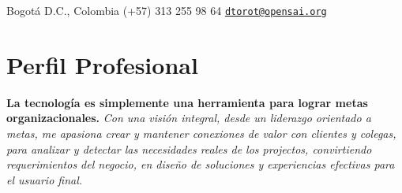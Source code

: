 \documentclass[overlapped,line,final]{../../templates/MichaelDeCorteCV/lib/res}
\begin{document}

\begin{resume}


	\begin{minipage}{0.5\linewidth}
    		Bogotá D.C., Colombia \newline
    		(+57) 313 255 98 64 \newline
		{\tt \href{mailto:dtorot@opensai.org}{dtorot@opensai.org}}
	\end{minipage}


\vspace{0.5cm}
\section{\sc Perfil Profesional}
\vspace{0.5cm}

	\textbf {La tecnología es simplemente una herramienta para lograr metas organizacionales.}
	\textit {Con una visión integral, desde un liderazgo orientado a metas, me apasiona crear y mantener conexiones de valor con clientes y colegas, para analizar y detectar las necesidades reales de los projectos, convirtiendo requerimientos del negocio, en diseño de soluciones y experiencias efectivas para el usuario final.}


\end{resume}
\end{document}
